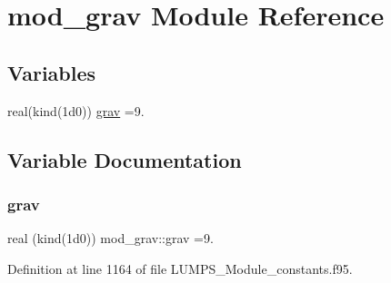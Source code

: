 \hypertarget{namespacemod__grav}{}\section{mod\+\_\+grav Module Reference}
\label{namespacemod__grav}
\subsection*{Variables}
\begin{DoxyCompactItemize}
\item 
real(kind(1d0)) \hyperlink{namespacemod__grav_a582b71e075d46273d35f8b2f62ae8aec}{grav} =9.
\end{DoxyCompactItemize}


\subsection{Variable Documentation}
\mbox{\label{namespacemod__grav_a582b71e075d46273d35f8b2f62ae8aec}} 
\subsubsection{\texorpdfstring{grav}{grav}}
{\footnotesize\ttfamily real (kind(1d0)) mod\+\_\+grav\+::grav =9.}



Definition at line 1164 of file L\+U\+M\+P\+S\+\_\+\+Module\+\_\+constants.\+f95.

